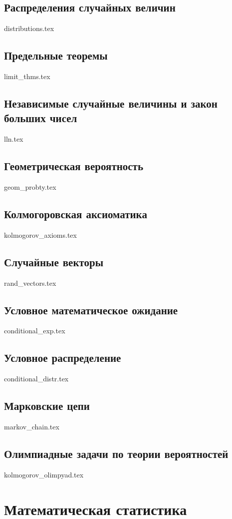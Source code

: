 \documentclass{book}
\theoremstyle{mydef}
\theoremstyle{myth}
\begin{document}
\section{Распределения случайных величин}

{distributions.tex}

\section{Предельные теоремы}

{limit_thms.tex}

\section{Независимые случайные величины и закон больших чисел}

{lln.tex}

\section{Геометрическая вероятность}

{geom_probty.tex}

\section{Колмогоровская аксиоматика}

{kolmogorov_axioms.tex}

\section{Случайные векторы}

{rand_vectors.tex}

\section{Условное математическое ожидание}

{conditional_exp.tex}

\section{Условное распределение}

{conditional_distr.tex}

\section{Марковские цепи}

{markov_chain.tex}

\section{Олимпиадные задачи по теории вероятностей}

{kolmogorov_olimpyad.tex}

\chapter{Математическая статистика}
\end{document}
